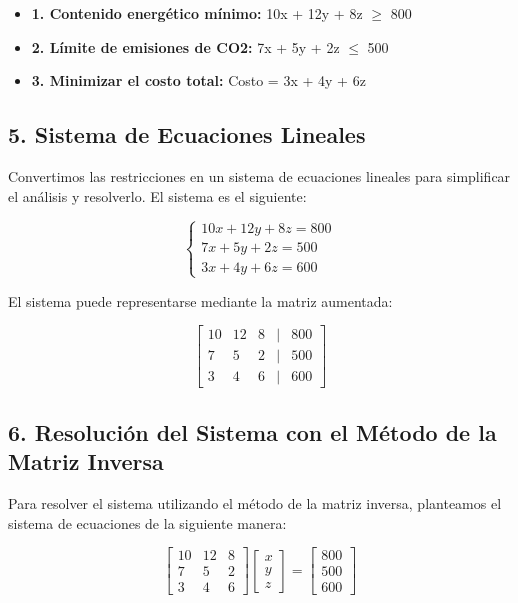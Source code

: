 \documentclass[]{article}
\begin{document}
	\begin{itemize}
		\item \textbf{1. Contenido energético mínimo:} 10x + 12y + 8z $\geq$ 800
		\item \textbf{2. Límite de emisiones de CO2:} 7x + 5y + 2z $\leq$ 500
		\item \textbf{3. Minimizar el costo total:} Costo = 3x + 4y + 6z
	\end{itemize}
	
	\subsection*{5. Sistema de Ecuaciones Lineales}
	Convertimos las restricciones en un sistema de ecuaciones lineales para simplificar el análisis y resolverlo. El sistema es el siguiente:
	
	\[ 
	\begin{cases}
		10x + 12y + 8z = 800 \\
		7x + 5y + 2z = 500 \\
		3x + 4y + 6z = 600
	\end{cases}
	\]
	
	El sistema puede representarse mediante la matriz aumentada:
	
	\[
	\begin{bmatrix}
		10 & 12 & 8 & | & 800 \\
		7 & 5 & 2 & | & 500 \\
		3 & 4 & 6 & | & 600
	\end{bmatrix}
	\]
	
	\subsection*{6. Resolución del Sistema con el Método de la Matriz Inversa}
	Para resolver el sistema utilizando el método de la matriz inversa, planteamos el sistema de ecuaciones de la siguiente manera:
	
	\[
	\begin{bmatrix}
		10 & 12 & 8 \\
		7 & 5 & 2 \\
		3 & 4 & 6
	\end{bmatrix}
	\begin{bmatrix}
		x \\
		y \\
		z
	\end{bmatrix}
	=
	\begin{bmatrix}
		800 \\
		500 \\
		600
	\end{bmatrix}
	\]
	
\end{document}
